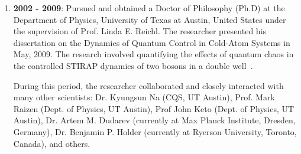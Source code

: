 \documentclass[a4paper,11pt,color]{article}
\begin{document}
\begin{enumerate}
\item
\textbf{2002 - 2009}: Pursued and obtained a Doctor of Philosophy (Ph.D) at the Department of Physics, University of Texas at Austin, United States under the supervision of Prof. Linda E. Reichl. The researcher presented his dissertation on the Dynamics of Quantum Control in Cold-Atom Systems in May, 2009. The research involved quantifying the effects of quantum chaos in the controlled STIRAP dynamics of two bosons in a double well~\cite{floquet:dblwell}. 

During this period, the researcher collaborated and closely interacted with many other scientists: Dr. Kyungsun Na (CQS, UT Austin), Prof. Mark Raizen (Dept. of Physics, UT Austin), Prof John Keto (Dept. of Physics, UT Austin), Dr. Artem M. Dudarev (currently at Max Planck Institute, Dresden, Germany), Dr. Benjamin P. Holder (currently at Ryerson University, Toronto, Canada), and others. 


\end{enumerate}
\end{document}
